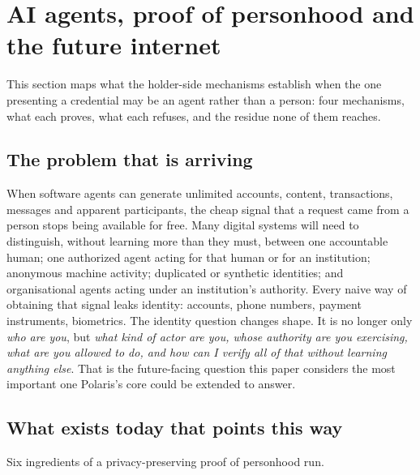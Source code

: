 \section{AI agents, proof of personhood and the future internet}
\label{sec:agents}



This section maps what the holder-side mechanisms establish when the one presenting a credential
may be an agent rather than a person: four mechanisms, what each proves, what each refuses, and the
residue none of them reaches.

\subsection{The problem that is arriving}

When software agents can generate unlimited accounts, content, transactions, messages and apparent
participants, the cheap signal that a request came from a person stops being available for free.
Many digital systems will need to distinguish, without learning more than they must, between one
accountable human; one authorized agent acting for that human or for an institution; anonymous
machine activity; duplicated or synthetic identities; and organisational agents acting under an
institution's authority. Every naive way of obtaining that signal leaks identity: accounts, phone
numbers, payment instruments, biometrics. The identity question changes shape. It is no longer only
\emph{who are you}, but \emph{what kind of actor are you, whose authority are you exercising, what
are you allowed to do, and how can I verify all of that without learning anything else}. That is
the future-facing question this paper considers the most important one Polaris's core could be
extended to answer.

\subsection{What exists today that points this way}

Six ingredients of a privacy-preserving proof of personhood run.

